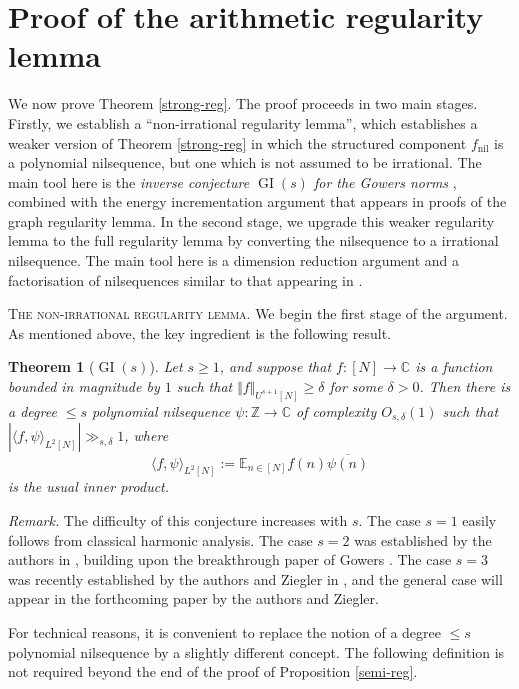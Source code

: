 \documentclass[11pt,reqno]{amsart}
\numberwithin{equation}{section}
\theoremstyle{plain}
\newtheorem{theorem}[subsection]{Theorem}
\theoremstyle{definition}
\renewcommand{\leq}{\leqslant}
\renewcommand{\geq}{\geqslant}
\newcommand\E{{\mathbb{E}}}
\newcommand\Z{\mathbb{Z}}
\newcommand\C{\mathbb{C}}
\newcommand\1{{\bf 1}}
\newcommand\2{{\bf 2}}
\newcommand\GI{\operatorname{GI}}
\newcommand\nil{{\operatorname{nil}}}
\begin{document}
\section{Proof of the arithmetic regularity lemma}\label{regularity-sec}

We now prove Theorem \ref{strong-reg}.  The proof proceeds in two main stages.  Firstly, we establish a ``non-irrational regularity lemma'', which establishes a weaker version of Theorem \ref{strong-reg} in which the structured component $f_\nil$ is a polynomial nilsequence, but one which is not assumed to be irrational.  The main tool here is the \emph{inverse conjecture $\GI(s)$ for the Gowers norms} \cite{uk-inverse}, combined with the energy incrementation argument that appears in proofs of the graph regularity lemma.  In the second stage, we upgrade this weaker regularity lemma to the full regularity lemma by converting the nilsequence to a irrational nilsequence.  The main tool here is a dimension reduction argument and a factorisation of nilsequences similar to that appearing in \cite{green-tao-nilratner}.

\textsc{The non-irrational regularity lemma.} We begin the first stage of the argument.  As mentioned above, the key ingredient is the following result.  

\begin{theorem}[$\GI(s)$]\label{gis-conj}
Let $s \geq 1$, and suppose that $f : [N] \rightarrow \C$ is a function bounded in magnitude by $1$ such that $\Vert f \Vert_{U^{s+1}[N]} \geq \delta$ for some $\delta>0$. Then there is a degree $\leq s$ polynomial nilsequence $\psi: \Z \to \C$ of complexity $O_{s,\delta}(1)$ such that $|\langle f, \psi \rangle_{L^2[N]}| \gg_{s,\delta} 1$, where 
$$ \langle f, \psi\rangle_{L^2[N]} := \E_{n \in [N]} f(n) \overline{\psi(n)}$$
is the usual inner product.
\end{theorem}

\emph{Remark.} The difficulty of this conjecture increases with $s$.  The case $s=1$ easily follows from classical harmonic analysis.  The case $s=2$ was established by the authors in \cite{green-tao-u3inverse}, building upon the breakthrough paper of Gowers \cite{gowers-4aps}.  The case $s=3$ was recently established by the authors and Ziegler in \cite{green-tao-ziegler-u4inverse}, and the general case will appear in the forthcoming paper \cite{uk-inverse} by the authors and Ziegler.

For technical reasons, it is convenient to replace the notion of a degree $\leq s$ polynomial nilsequence by a slightly different concept.  The following definition is not required beyond the end of the proof of Proposition \ref{semi-reg}.
\end{document}

